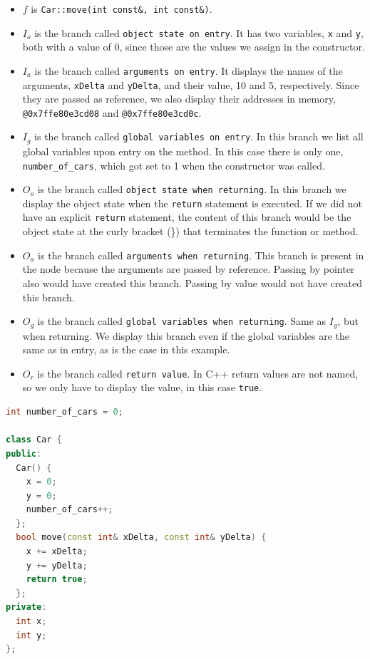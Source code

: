 \begin{definition}[Node]
\begin{exmp}
\begin{itemize}
    \item \(f\) is \verb|Car::move(int const&, int const&)|.
    \item \(I_o\) is the branch called \verb|object state on entry|. It has two variables, \verb|x| and \verb|y|, both with a value of 0, since those are the values we assign in the constructor.
    \item \(I_a\) is the branch called \verb|arguments on entry|. It displays the names of the arguments, \verb|xDelta| and \verb|yDelta|, and their value, 10 and 5, respectively. Since they are passed as reference, we also display their addresses in memory, \verb"@0x7ffe80e3cd08" and \verb"@0x7ffe80e3cd0c".
    \item \(I_g\) is the branch called \verb|global variables on entry|. In this branch we list all global variables upon entry on the method. In this case there is only one, \verb|number_of_cars|, which got set to 1 when the constructor was called.
    \item \(O_o\) is the branch called \verb|object state when returning|. In this branch we display the object state when the \verb|return| statement is executed. If we did not have an explicit \verb|return| statement, the content of this branch would be the object state at the curly bracket (\}) that terminates the function or method. 
    \item \(O_a\) is the branch called \verb|arguments when returning|. This branch is present in the node because the arguments are passed by reference. Passing by pointer also would have created this branch. Passing by value would not have created this branch.
    \item \(O_g\) is the branch called \verb|global variables when returning|. Same as \(I_g\), but when returning. We display this branch even if the global variables are the same as in entry, as is the case in this example.
    \item \(O_r\) is the branch called \verb|return value|. In C++ return values are not named, so we only have to display the value, in this case \verb|true|. 
\end{itemize}

\begin{lstlisting}[style=interfaces, language=C++, caption=Car class, frame=tb, label={lst:carClass}]
int number_of_cars = 0;

class Car {
public:
  Car() {
    x = 0;
    y = 0;
    number_of_cars++;
  };
  bool move(const int& xDelta, const int& yDelta) {
    x += xDelta;
    y += yDelta;
    return true;
  };
private:
  int x;
  int y;
};


\end{lstlisting}
\end{exmp}
\end{definition}
